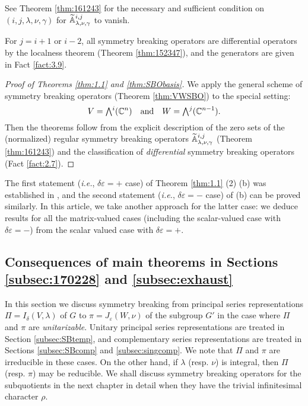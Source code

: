 See Theorem \ref{thm:161243} for the necessary 
 and sufficient condition on $(i,j,\lambda,\nu,\gamma)$
 for ${\widetilde{\mathbb{A}}}_{{\lambda},{\nu},{\gamma}}^{{i,j}}$ to vanish.  

\begin{remark}
For $j=i+1$ or $i-2$, 
all symmetry breaking operators
 are differential operators
 by the localness theorem
 (Theorem \ref{thm:152347}), 
 and the generators are given in Fact \ref{fact:3.9}. 
\end{remark}



\begin{proof}
[Proof of Theorems \ref{thm:1.1} and \ref{thm:SBObasis}]
We apply the general scheme
 of symmetry breaking operators
 (Theorem \ref{thm:VWSBO})
 to the special setting:
\[
   V=\Exterior^i({\mathbb{C}}^n)
\quad
  \text{and}
\quad
   W=\Exterior^j({\mathbb{C}}^{n-1}).  
\]
Then the theorems follow from the explicit description
 of the zero sets
 of the (normalized) regular symmetry breaking operators
 ${\widetilde{\mathbb{A}}}_{{\lambda},{\nu},{\gamma}}^{{i,j}}$
 (Theorem \ref{thm:161243})
 and the classification
 of {\it{differential}} symmetry breaking operators
 (Fact \ref{fact:2.7}).  
\end{proof}

\begin{remark}
The first statement ({\it{i.e.}}, $\delta \varepsilon=+$ case)
 of Theorem \ref{thm:1.1} (2) (b)
 was established in \cite[Thm.~1.1]{sbon},
 and the second statement ({\it{i.e.}}, $\delta \varepsilon=-$ case) of (b)
 can be proved similarly.  
In this article,
 we take another approach for the latter case:
we deduce results
 for all the matrix-valued cases
 (including the scalar-valued case with $\delta \varepsilon=-$) from 
 the scalar valued case with $\delta \varepsilon=+$.  
\end{remark}



\subsection{Consequences of main theorems in Sections \ref{subsec:170228} and \ref{subsec:exhaust}}
\label{subsec:3.6}
In this section
 we discuss symmetry breaking from principal series representations
 $\Pi=I_{\delta}(V,\lambda)$ of $G$
 to $\pi=J_{\varepsilon}(W,\nu)$ of the subgroup $G'$
 in the case
 where $\Pi$ and $\pi$ are {\it{unitarizable}}.  
Unitary principal series representations
 are treated in Section \ref{subsec:SBtemp}, 
 and complementary series representations
 are treated
 in Sections \ref{subsec:SBcomp} and \ref{subsec:singcomp}.  
We note that $\Pi$ and $\pi$ are irreducible
 in these cases.  
On the other hand,
 if $\lambda$ (resp. $\nu$) is integral, 
 then $\Pi$ (resp. $\pi$) may be reducible.  
We shall discuss symmetry breaking operators
 for the subquotients 
 in the next chapter
 in detail
 when they have the trivial infinitesimal character $\rho$.  


